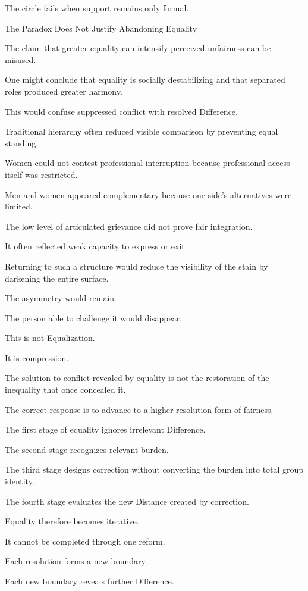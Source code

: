 The circle fails when support remains only formal.

The Paradox Does Not Justify Abandoning Equality

The claim that greater equality can intensify perceived unfairness can be misused.

One might conclude that equality is socially destabilizing and that separated roles produced greater harmony.

This would confuse suppressed conflict with resolved Difference.

Traditional hierarchy often reduced visible comparison by preventing equal standing.

Women could not contest professional interruption because professional access itself was restricted.

Men and women appeared complementary because one side’s alternatives were limited.

The low level of articulated grievance did not prove fair integration.

It often reflected weak capacity to express or exit.

Returning to such a structure would reduce the visibility of the stain by darkening the entire surface.

The asymmetry would remain.

The person able to challenge it would disappear.

This is not Equalization.

It is compression.

The solution to conflict revealed by equality is not the restoration of the inequality that once concealed it.

The correct response is to advance to a higher-resolution form of fairness.

The first stage of equality ignores irrelevant Difference.

The second stage recognizes relevant burden.

The third stage designs correction without converting the burden into total group identity.

The fourth stage evaluates the new Distance created by correction.

Equality therefore becomes iterative.

It cannot be completed through one reform.

Each resolution forms a new boundary.

Each new boundary reveals further Difference.


